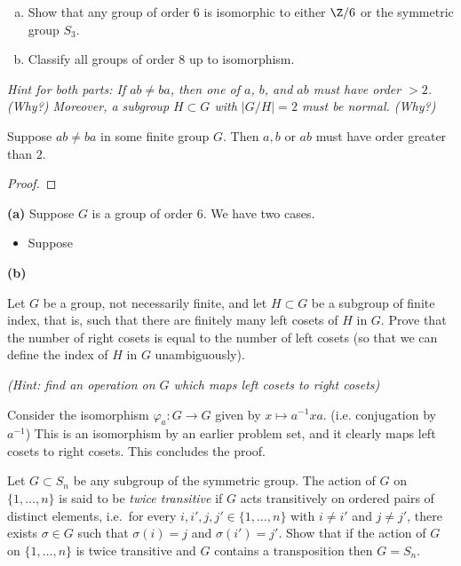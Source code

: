 \documentclass[11pt,letterpaper]{article}
\begin{document}
\pagebreak
\begin{problem}
\leavevmode
\begin{enumerate}[(a)]
  \item Show that any group of order 6 is isomorphic to either $\Z/6$ or the symmetric group $S_3$.
  \item Classify all groups of order 8 up to isomorphism.
\end{enumerate}
\end{problem}
\textit{Hint for both parts: If $ab\neq ba$, then one of $a$, $b$, and $ab$ must have order $>2$. (Why?) Moreover, a subgroup $H\subset G$ with $|G/H|=2$ must be normal. (Why?)}

\begin{lemma}
  Suppose $ab\neq ba$ in some finite group $G$. Then $a,b$ or $ab$ must have order greater than $2$.   
\end{lemma}
\begin{proof}

\end{proof}

\textbf{(a)} Suppose $G$ is a group of order $6$. We have two cases.
\begin{itemize}
  \item Suppose 
\end{itemize}

\textbf{(b)}

\pagebreak
\begin{problem}
Let $G$ be a group, not necessarily finite, and let $H \subset G$ be a subgroup of finite index, that is, such that there are finitely many left cosets of $H$ in $G$. Prove that the number of right cosets is equal to the number of left cosets (so that we can define the index of $H$ in $G$ unambiguously).
\end{problem}
\textit{(Hint: find an operation on $G$ which maps left
cosets to right cosets)}

Consider the isomorphism $\varphi_a : G \to G$ given by $x\mapsto a^{-1}xa$. (i.e. conjugation by $a^{-1}$) This is an isomorphism by an earlier problem set, and it clearly maps left cosets to right cosets. This concludes the proof.  

\pagebreak
\begin{problem}
Let $G\subset S_n$ be any subgroup of the symmetric group. The action of $G$ on $\{1,\dots,n\}$ is said to be {\em twice transitive} if $G$ acts transitively on ordered pairs of distinct elements, i.e.\ for every $i,i',j,j'\in\{1,\dots,n\}$ with $i\neq i'$ and $j\neq j'$, there exists $\sigma\in G$ such that $\sigma(i)=j$ and $\sigma(i')=j'$. Show that if the action of $G$ on $\{1,\dots,n\}$ is twice transitive and $G$ contains a transposition then $G=S_n$.
\end{problem}
\end{document}
